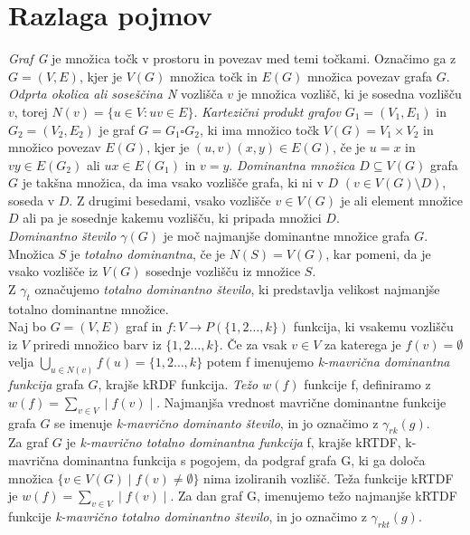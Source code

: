 \documentclass[12pt,a4paper]{amsart}
\begin{document}
\section{Razlaga pojmov}

\textit{Graf G} je množica točk v prostoru in povezav med temi točkami. Označimo ga z $G=(V, E)$, kjer je $V(G)$ množica točk in $E(G)$ množica povezav grafa $G$.
\textit{Odprta okolica ali soseščina N} vozlišča $v$ je množica vozlišč, ki je sosedna vozlišču $v$, torej $N(v) =\{ u\in V: uv\in E \}$. \textit{Kartezični produkt grafov} $G_1 = (V_1, E_1)$ in $G_2 = (V_2, E_2)$ je graf $G = G_1 \square G_2$, ki ima množico točk $ V(G) = V_1 \times V_2$ in množico povezav $ E(G)$, kjer je $(u,v)(x,y) \in E(G)$, če je $ u=x $ in $vy \in E(G_2) $ ali $ux \in E(G_1)$ in $v = y$.
\textit{Dominantna množica $ D \subseteq V(G) $} grafa $G$ je takšna množica, da ima vsako vozlišče grafa, ki ni v $D$ $( v \in V(G) \setminus D)$, soseda v $D$. Z drugimi besedami, vsako vozlišče  $v \in V(G)$ je ali  element množice $D$ ali pa je sosednje kakemu vozlišču, ki pripada množici $D$.  \\ \textit{ Dominantno število $\gamma(G) $} je moč najmanjše dominantne množice grafa $G$. \\
Množica $S$ je \textit{totalno dominantna}, če je $ N(S) = V(G)$, kar pomeni, da je vsako vozlišče iz $ V(G)$ sosednje vozlišču iz množice $S$. \\
 Z \textit{$ \gamma_t $ }označujemo \textit{totalno dominantno število}, ki predstavlja velikost najmanjše totalno dominantne množice. \\
Naj bo $G=(V, E)$ graf in $f: V \to P (\{1,2\dots,k\})$ funkcija, ki vsakemu vozlišču iz $V$ priredi množico barv iz $ \{1,2\dots,k\}$. Če za vsak $v \in V$ za katerega je $ f(v) = \emptyset $ velja $ \bigcup_{u \in N(v) } f(u) = \{1,2\dots,k\}$ potem f imenujemo\textit{  k-mavrična dominantna funkcija } grafa $G$, krajše kRDF funkcija. \textit{Težo $w(f)$ } funkcije f, definiramo z $w(f) = \sum_{v \in V} \mid f(v)\mid$. Najmanjša vrednost mavrične dominantne funkcije grafa $G$ se imenuje \textit{k-mavrično dominanto število}, in jo označimo z $\gamma_{rk} (g)$.\\
Za graf $G$ je \textit{k-mavrično totalno dominantna funkcija} f, krajše kRTDF,  k-mavrična dominantna funkcija s pogojem, da podgraf grafa G, ki ga določa množica $\{v \in V(G) \mid f(v) \neq \emptyset \}$ nima izoliranih vozlišč. Teža funkcije kRTDF je  $w(f) = \sum_{v \in V} \mid f(v)\mid$. Za dan graf G, imenujemo težo najmanjše kRTDF funkcije \textit{k-mavrično totalno dominantno število}, in jo označimo z  $\gamma_{rkt} (g)$. 
\end{document}
